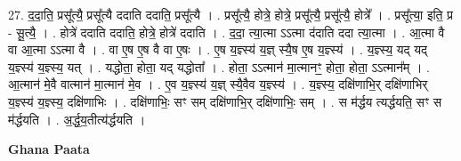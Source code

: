 \documentclass[17pt]{extarticle}
\begin{document}
27. द॒दा॒ति॒ प्रसू᳚त्यै॒ प्रसू᳚त्यै ददाति ददाति॒ प्रसू᳚त्यै । . प्रसू᳚त्यै॒ होत्रे॒ होत्रे॒ प्रसू᳚त्यै॒ प्रसू᳚त्यै॒ होत्रे᳚ । . प्रसू᳚त्या॒ इति॒ प्र - सू॒त्यै॒ । . होत्रे॑ ददाति ददाति॒ होत्रे॒ होत्रे॑ ददाति । . द॒दा॒ त्या॒त्मा ऽऽत्मा द॑दाति ददा त्या॒त्मा । . आ॒त्मा वै वा आ॒त्मा ऽऽत्मा वै । . वा ए॒ष ए॒ष वै वा ए॒षः । . ए॒ष य॒ज्ञ्स्य॑ य॒ज्ञ् स्यै॒ष ए॒ष य॒ज्ञ्स्य॑ । . य॒ज्ञ्स्य॒ यद् यद् य॒ज्ञ्स्य॑ य॒ज्ञ्स्य॒ यत् । . यद्धोता॒ होता॒ यद् यद्धोता᳚ । . होता॒ ऽऽत्मान॑ मा॒त्मानꣳ॒॒ होता॒ होता॒ ऽऽत्मान᳚म् । . आ॒त्मान॑ मे॒वै वात्मान॑ मा॒त्मान॑ मे॒व । . ए॒व य॒ज्ञ्स्य॑ य॒ज्ञ् स्यै॒वैव य॒ज्ञ्स्य॑ । . य॒ज्ञ्स्य॒ दक्षि॑णाभि॒र् दक्षि॑णाभिर् य॒ज्ञ्स्य॑ य॒ज्ञ्स्य॒ दक्षि॑णाभिः । . दक्षि॑णाभिः॒ सꣳ सम् दक्षि॑णाभि॒र् दक्षि॑णाभिः॒ सम् । . स म॑र्द्धय त्यर्द्धयति॒ सꣳ स म॑र्द्धयति । . अ॒र्द्ध॒य॒तीत्य॑र्द्धयति । \newline

\textbf{Ghana Paata } \newline
\end{document}
